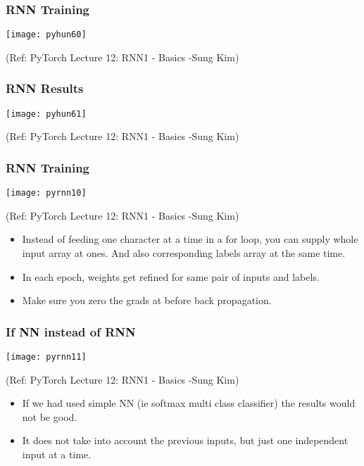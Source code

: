\begin{frame}[fragile] \frametitle{RNN Training}

\begin{center}
\texttt{[image: pyhun60]}

\tiny{(Ref: PyTorch Lecture 12: RNN1 - Basics -Sung Kim)}
\end{center}


\end{frame}


\begin{frame}[fragile] \frametitle{RNN Results}

\begin{center}
\texttt{[image: pyhun61]}

\tiny{(Ref: PyTorch Lecture 12: RNN1 - Basics -Sung Kim)}
\end{center}


\end{frame}

\begin{frame}[fragile] \frametitle{RNN Training}

\begin{center}
\texttt{[image: pyrnn10]}

\tiny{(Ref: PyTorch Lecture 12: RNN1 - Basics -Sung Kim)}
\end{center}

\begin{itemize}
\item Instead of feeding one character at a time in a for loop, you can supply whole input array at ones. And also corresponding labels array at the same time.
\item In each epoch, weights get refined for same pair of inputs and labels.
\item Make sure you zero the grads at before back propagation.
\end{itemize}
\end{frame}

\begin{frame}[fragile] \frametitle{If NN instead of RNN}

\begin{center}
\texttt{[image: pyrnn11]}

\tiny{(Ref: PyTorch Lecture 12: RNN1 - Basics -Sung Kim)}
\end{center}

\begin{itemize}
\item If we had used simple NN (ie softmax multi class classifier) the results would not be good.
\item It does not take into account the previous inputs, but just one independent input at a time.
\end{itemize}
\end{frame}

